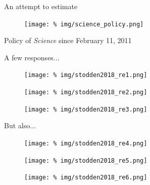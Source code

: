 \begin{frame}{An attempt to estimate }

  
  \begin{figure}
    \centering
    \texttt{[image: \%
      img/science\_policy.png]} %
  \end{figure}

  \begin{flushright}
    Policy of \textit{Science} since February 11, 2011
  \end{flushright}


  
\end{frame}

\begin{frame}{A few responses...}
  
  \begin{figure}
    \centering
    \texttt{[image: \%
      img/stodden2018\_re1.png]} %
  \end{figure}

  \begin{figure}
    \centering
    \texttt{[image: \%
      img/stodden2018\_re2.png]} %
  \end{figure}

  \begin{figure}
    \centering
    \texttt{[image: \%
      img/stodden2018\_re3.png]} %
  \end{figure}

  
\end{frame}

\begin{frame}{But also...}
  
  \begin{figure}
    \centering
    \texttt{[image: \%
      img/stodden2018\_re4.png]} %
  \end{figure}

  \begin{figure}
    \centering
    \texttt{[image: \%
      img/stodden2018\_re5.png]} %
  \end{figure}

  \begin{figure}
    \centering
    \texttt{[image: \%
      img/stodden2018\_re6.png]} %
  \end{figure}

  
\end{frame}


